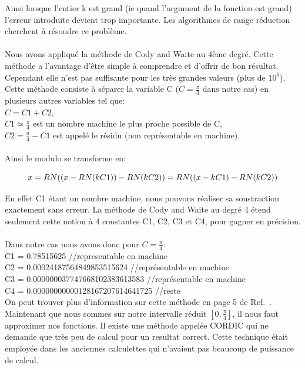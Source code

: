 \documentclass[12pt]{article}
\begin{document}
Ainsi lorsque l'entier k est grand (ie quand l'argument de la fonction est grand) l'erreur
introduite devient trop importante. Les algorithmes de range réduction cherchent à résoudre ce problème.
\\
\\
Nous avons appliqué la méthode de Cody and Waite au 4ème degré. Cette méthode a l'avantage d'être simple
à comprendre et d'offrir de bon résultat. Cependant elle n'est pas suffisante pour les très grandes valeurs
(plus de $10^6$).\\
Cette méthode consiste à séparer la variable C ($C = \frac{\pi}{4}$ dans notre cas) en plusieurs autres variables
tel que:\\
$C = C1 + C2$, \\
$C1 \simeq \frac{\pi}{4}$  est un nombre machine le plus proche possible de C, \\
$C2 = \frac{\pi}{4} - C1$ est appelé le résidu (non représentable en machine). \\
\\
Ainsi le modulo se transforme en:
\begin{center}
\begin{equation}
$$x = RN((x - RN(kC1)) - RN(kC2)) = RN((x - kC1) - RN(kC2))$$
\end{equation}
\end{center}

En effet C1 étant un nombre machine, nous pouvons réaliser sa soustraction exactement
sans erreur. La méthode de Cody and Waite au degré 4 étend seulement cette notion
à 4 constantes C1, C2, C3 et C4, pour gagner en précision.\\
\\
Dans notre cas nous avons donc pour $C = \frac{\pi}{4}$:\\

\noindent C1 = 0.78515625  //representable en machine \\
C2 = 0.00024187564849853515624  //représentable en machine \\
C3 = 0.000000037747668102383613583  //représentable en machine\\
C4 = 0.00000000000128167207614641725  //reste\\


On peut trouver plus d'information sur cette méthode en page 5 de Ref.~\cite{paper1}.\\
Maintenant que nous sommes sur notre intervalle réduit $[0, \frac{\pi}{4}]$, il nous faut
approximer nos fonctions. Il existe une méthode appelée CORDIC qui ne demande
que très peu de calcul pour un resultat correct. Cette technique était employée
dans les anciennes calculettes qui n'avaient pas beaucoup de puissance de calcul.\\
\end{document}
